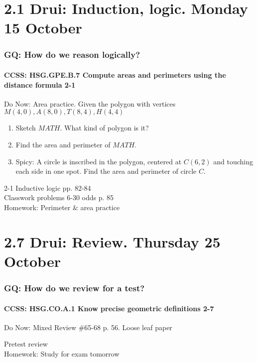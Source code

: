 \documentclass{beamer}
\begin{document}
\section{2.1 Drui: Induction, logic. Monday 15 October}
  \frame
  {
    \frametitle{GQ: How do we reason logically?}
    \framesubtitle{CCSS: HSG.GPE.B.7 Compute areas and perimeters using the distance formula  \alert{2-1}}

    \begin{block}{Do Now: Area practice. Given the polygon with vertices $M(4,0), A(8,0), T(8,4), H(4,4)$}
    \begin{enumerate}
        \item Sketch $MATH$. What kind of polygon is it?
        \item Find the area and perimeter of $MATH$.
        \item Spicy: A circle is inscribed in the polygon, centered at $C(6,2)$ and touching each side in one spot. Find the area and perimeter of circle $C$.
    \end{enumerate}
    \end{block}
    2-1 Inductive logic  pp. 82-84\\
    Classwork problems 6-30 odds p. 85\\
    \vspace{0.5cm}
    Homework: Perimeter \& area practice
  }

\section{2.7 Drui: Review. Thursday 25 October}
\frame
{
  \frametitle{GQ: How do we review for a test?}
  \framesubtitle{CCSS: HSG.CO.A.1 Know precise geometric definitions  \alert{2-7}}

  \begin{block}{Do Now: Mixed Review \#65-68 p. 56. Loose leaf paper}
  \end{block}
  Pretest review\\
  \vspace{0.5cm}
  Homework: Study for \alert{exam tomorrow}
}
\end{document}

